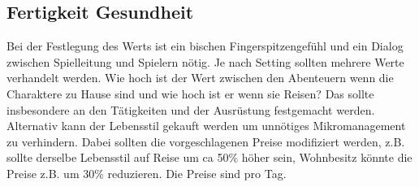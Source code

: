 \documentclass{article}
\begin{document}
\begin{center}
\subsection{Fertigkeit Gesundheit}
\end{center}

Bei der Festlegung des Werts ist ein bischen Fingerspitzengefühl und ein Dialog zwischen Spielleitung und Spielern
nötig. Je nach Setting sollten mehrere Werte verhandelt werden. Wie hoch ist der Wert zwischen den Abenteuern wenn
die Charaktere zu Hause sind und wie hoch ist er wenn sie Reisen? Das sollte insbesondere an den Tätigkeiten und der
Ausrüstung festgemacht werden. Alternativ kann der Lebensstil gekauft werden um unnötiges Mikromanagement zu
verhindern. Dabei sollten die vorgeschlagenen Preise modifiziert werden, z.B. sollte derselbe Lebensstil auf Reise
um ca 50\% höher sein, Wohnbesitz könnte die Preise z.B. um 30\% reduzieren. Die Preise sind pro Tag.
\end{document}
